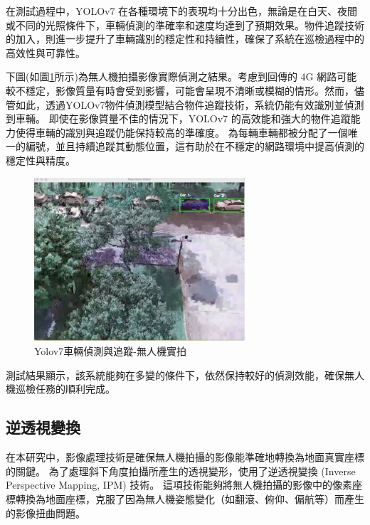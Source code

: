 \documentclass[12pt]{article}       %
\begin{document}
在測試過程中，YOLOv7 在各種環境下的表現均十分出色，無論是在白天、夜間或不同的光照條件下，車輛偵測的準確率和速度均達到了預期效果。物件追蹤技術的加入，則進一步提升了車輛識別的穩定性和持續性，確保了系統在巡檢過程中的高效性與可靠性。

下圖(如圖\ref{fig:yoloreal1}所示)為無人機拍攝影像實際偵測之結果。考慮到回傳的 4G 網路可能較不穩定，影像質量有時會受到影響，可能會呈現不清晰或模糊的情形。然而，儘管如此，透過YOLOv7物件偵測模型結合物件追蹤技術，系統仍能有效識別並偵測到車輛。
即使在影像質量不佳的情況下，YOLOv7 的高效能和強大的物件追蹤能力使得車輛的識別與追蹤仍能保持較高的準確度。
為每輛車輛都被分配了一個唯一的編號，並且持續追蹤其動態位置，這有助於在不穩定的網路環境中提高偵測的穩定性與精度。

\begin{figure}[H]
    \centering
    \includegraphics[width=0.7\textwidth]{yoloreal1.jpg}     %
    \caption{Yolov7車輛偵測與追蹤-無人機實拍}    %
    \label{fig:yoloreal1}    %
\end{figure}

測試結果顯示，該系統能夠在多變的條件下，依然保持較好的偵測效能，確保無人機巡檢任務的順利完成。

\subsection{逆透視變換}
\hspace{2em}在本研究中，影像處理技術是確保無人機拍攝的影像能準確地轉換為地面真實座標的關鍵。
為了處理斜下角度拍攝所產生的透視變形，使用了逆透視變換 (Inverse Perspective Mapping, IPM) 技術。
這項技術能夠將無人機拍攝的影像中的像素座標轉換為地面座標，克服了因為無人機姿態變化（如翻滾、俯仰、偏航等）而產生的影像扭曲問題。
\end{document}
